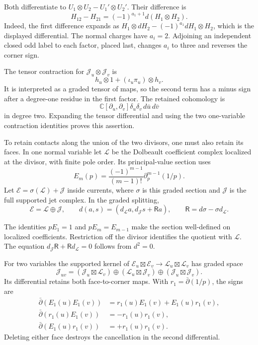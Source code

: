 Both differentiate to $U_1\otimes U_2-U_1'\otimes U_2'$.
Their difference is
\begin{equation}\label{mht:eq:normal-corner-homotopy}
 H_{12}-H_{21}=(-1)^{a_1+1}d(H_1\otimes H_2).
\end{equation}
Indeed, the first difference expands as
$H_1\otimes dH_2-(-1)^{a_1}dH_1\otimes H_2$,
which is the displayed differential. The normal charges have
$a_i=2$. Adjoining an independent closed odd label to each factor,
placed last, changes $a_i$ to three and reverses the corner sign.

The tensor contraction for $\mathcal J_u\otimes\mathcal J_v$ is
\[
 h_u\otimes1+(\iota_u\pi_u)\otimes h_v.
\]
It is interpreted as a graded tensor of maps, so the second term
has a minus sign after a degree-one residue in the first factor.
The retained cohomology is
\[
 \mathbb C[\partial_u,\partial_v]
     \delta_u\delta_v\,d\bar u\,d\bar v
\]
in degree two. Expanding the tensor differential and using the two
one-variable contraction identities proves this assertion.

To retain contacts along the union of the two divisors, one must also
retain its faces. In one normal variable let $\mathcal L$ be the
Dolbeault coefficient complex localized at the divisor, with finite
pole order. Its principal-value section uses
\[
 E_m(p)=\frac{(-1)^{m-1}}{(m-1)!}
                \partial_p^{m-1}(1/p).
\]
Let $\mathcal E=\sigma(\mathcal L)+\mathcal J$ inside currents,
where $\sigma$ is this graded section and $\mathcal J$ is the full
supported jet complex. In the graded splitting,
\[
 \mathcal E=\mathcal L\oplus\mathcal J,\qquad
 d(a,s)=(d_{\mathcal L}a,d_{\mathcal J}s+\mathsf Ra),\qquad
 \mathsf R=d\sigma-\sigma d_{\mathcal L}.
\]

The identities $pE_1=1$ and $pE_m=E_{m-1}$ make the section
well-defined on localized coefficients. Restriction off the divisor
identifies the quotient with $\mathcal L$.
The equation $d_{\mathcal J}\mathsf R+\mathsf R d_{\mathcal L}=0$
follows from $d^2=0$.

For two variables the supported kernel of
$\mathcal E_u\boxtimes\mathcal E_v\to
 \mathcal L_u\boxtimes\mathcal L_v$ has graded space
\begin{equation}\label{mht:eq:normal-face-kernel}
 \mathcal J_{uv}=
 (\mathcal J_u\boxtimes\mathcal L_v)
 \oplus(\mathcal L_u\boxtimes\mathcal J_v)
 \oplus(\mathcal J_u\boxtimes\mathcal J_v).
\end{equation}
Its differential retains both face-to-corner maps. With
$r_1=\bar\partial(1/p)$, the signs are
\begin{align*}
 \bar\partial(E_1(u)E_1(v))
   &=r_1(u)E_1(v)+E_1(u)r_1(v),\\
 \bar\partial(r_1(u)E_1(v))&=-r_1(u)r_1(v),\\
 \bar\partial(E_1(u)r_1(v))&=+r_1(u)r_1(v).
\end{align*}
Deleting either face destroys the cancellation in the second
differential.

